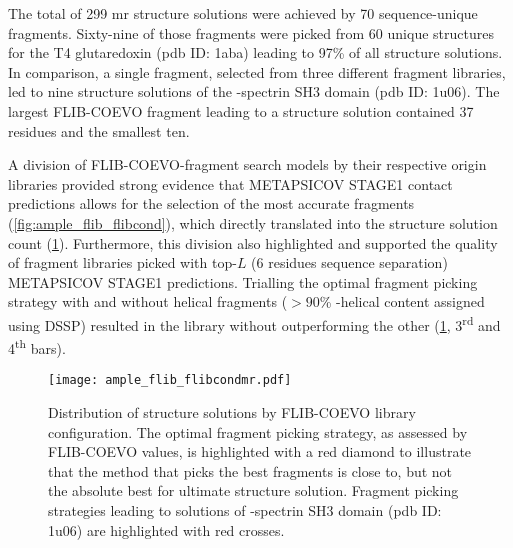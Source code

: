The total of 299 \gls{mr} structure solutions were achieved by 70 sequence-unique fragments. Sixty-nine of those fragments were picked from 60 unique structures for the T4 glutaredoxin (\gls{pdb} ID: 1aba) leading to 97\% of all structure solutions. In comparison, a single fragment, selected from three different fragment libraries, led to nine structure solutions of the \textalpha-spectrin SH3 domain (\gls{pdb} ID: 1u06). The largest FLIB-COEVO fragment leading to a structure solution contained 37 residues and the smallest ten.

A division of FLIB-COEVO-fragment search models by their respective origin libraries provided strong evidence that METAPSICOV STAGE1 contact predictions allows for the selection of the most accurate fragments (\cref{fig:ample_flib_flibcond}), which directly translated into the structure solution count (\cref{fig:ample_flib_flibcondmr}). Furthermore, this division also highlighted and supported the quality of fragment libraries picked with top-$L$ (6 residues sequence separation) METAPSICOV STAGE1 predictions. Trialling the optimal fragment picking strategy with and without helical fragments ($>90$\% \textalpha-helical content assigned using DSSP) resulted in the library without outperforming the other (\cref{fig:ample_flib_flibcondmr}, 3\textsuperscript{rd} and 4\textsuperscript{th} bars). 

\begin{figure}[H]
	\centering
	\texttt{[image: ample\_flib\_flibcondmr.pdf]}
	\caption[MR structure solutions by FLIB-COEVO library]{Distribution of structure solutions by FLIB-COEVO library configuration. The optimal fragment picking strategy, as assessed by FLIB-COEVO values, is highlighted with a red diamond to illustrate that the method that picks the best fragments is close to, but not the absolute best for ultimate structure solution. Fragment picking strategies leading to solutions of \textalpha-spectrin SH3 domain (\gls{pdb} ID: 1u06) are highlighted with red crosses.}
	\label{fig:ample_flib_flibcondmr}
\end{figure}

